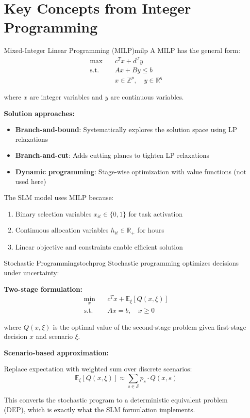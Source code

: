 \documentclass[11pt,a4paper]{article}
\newcommand{\R}{\mathbb{R}}
\newcommand{\Z}{\mathbb{Z}}
\newcommand{\E}{\mathbb{E}}
\begin{document}
\section{Key Concepts from Integer Programming}

\begin{keyconcept}{Mixed-Integer Linear Programming (MILP)}{milp}
A MILP has the general form:
\begin{align*}
\max \quad & c^T x + d^T y \\
\text{s.t.} \quad & Ax + By \leq b \\
& x \in \Z^p, \quad y \in \R^q
\end{align*}

where $x$ are integer variables and $y$ are continuous variables.

\textbf{Solution approaches:}
\begin{itemize}
    \item \textbf{Branch-and-bound}: Systematically explores the solution space using LP relaxations
    \item \textbf{Branch-and-cut}: Adds cutting planes to tighten LP relaxations
    \item \textbf{Dynamic programming}: Stage-wise optimization with value functions (not used here)
\end{itemize}

The SLM model uses MILP because:
\begin{enumerate}
    \item Binary selection variables $x_{it} \in \{0,1\}$ for task activation
    \item Continuous allocation variables $h_{it} \in \R_+$ for hours
    \item Linear objective and constraints enable efficient solution
\end{enumerate}
\end{keyconcept}

\begin{keyconcept}{Stochastic Programming}{stochprog}
Stochastic programming optimizes decisions under uncertainty:

\textbf{Two-stage formulation:}
\begin{align*}
\min_{x} \quad & c^T x + \E_\xi[Q(x, \xi)] \\
\text{s.t.} \quad & Ax = b, \quad x \geq 0
\end{align*}

where $Q(x, \xi)$ is the optimal value of the second-stage problem given first-stage decision $x$ and scenario $\xi$.

\textbf{Scenario-based approximation:}

Replace expectation with weighted sum over discrete scenarios:
$$\E_\xi[Q(x, \xi)] \approx \sum_{s \in \mathcal{S}} p_s \cdot Q(x, s)$$

This converts the stochastic program to a deterministic equivalent problem (DEP), which is exactly what the SLM formulation implements.
\end{keyconcept}
\end{document}
